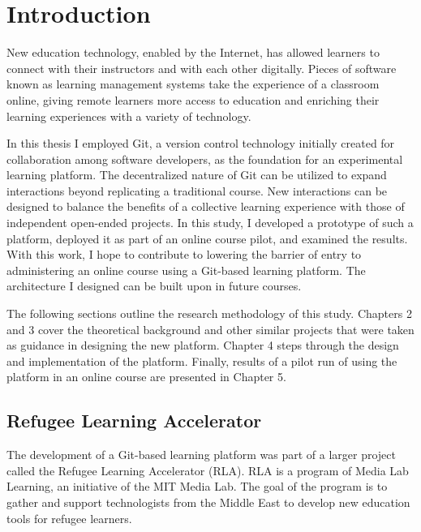 \documentclass[12pt,twoside]{mitthesis}
\begin{document}

\chapter{Introduction}

New education technology, enabled by the Internet, has allowed learners to connect with their instructors and with each other digitally. Pieces of software known as learning management systems take the experience of a classroom online, giving remote learners more access to education and enriching their learning experiences with a variety of technology.

In this thesis I employed Git, a version control technology initially created for collaboration among software developers, as the foundation for an experimental learning platform. The decentralized nature of Git can be utilized to expand interactions beyond replicating a traditional course. New interactions can be designed to balance the benefits of a collective learning experience with those of independent open-ended projects. In this study, I developed a prototype of such a platform, deployed it as part of an online course pilot, and examined the results. With this work, I hope to contribute to lowering the barrier of entry to administering an online course using a Git-based learning platform. The architecture I designed can be built upon in future courses. 

The following sections outline the research methodology of this study. Chapters 2 and 3 cover the theoretical background and other similar projects that were taken as guidance in designing the new platform. Chapter 4 steps through the design and implementation of the platform. Finally, results of a pilot run of using the platform in an online course are presented in Chapter 5. 

\section{Refugee Learning Accelerator}

The development of a Git-based learning platform was part of a larger project called the Refugee Learning Accelerator (RLA). RLA is a program of Media Lab Learning, an initiative of the MIT Media Lab. The goal of the program is to gather and support technologists from the Middle East to develop new education tools for refugee learners. 
\end{document}
